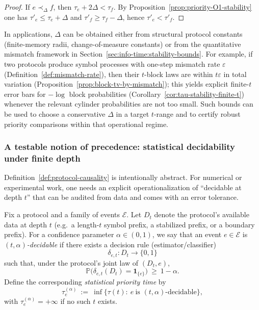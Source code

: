\begin{proof}
If $e\prec_\Delta f$, then $\tau_e+2\Delta<\tau_f$. By Proposition~\ref{prop:priority-O1-stability} one has $\tau'_e\le \tau_e+\Delta$ and $\tau'_f\ge \tau_f-\Delta$, hence $\tau'_e<\tau'_f$.
\end{proof}

\begin{remark}
In applications, $\Delta$ can be obtained either from structural protocol constants (finite-memory radii, change-of-measure constants) or from the quantitative mismatch framework in Section~\ref{sec:info-time:stability-bounds}.
For example, if two protocols produce symbol processes with one-step mismatch rate $\varepsilon$ (Definition~\ref{def:mismatch-rate}), then their $t$-block laws are within $t\varepsilon$ in total variation (Proposition~\ref{prop:block-tv-by-mismatch}); this yields explicit finite-$t$ error bars for $-\log$ block probabilities (Corollary~\ref{cor:tau-stability-finite-t}) whenever the relevant cylinder probabilities are not too small. Such bounds can be used to choose a conservative $\Delta$ in a target $t$-range and to certify robust priority comparisons within that operational regime.
\end{remark}

\subsubsection{A testable notion of precedence: statistical decidability under finite depth}\label{sec:causality:stat-testable}

Definition~\ref{def:protocol-causality} is intentionally abstract. For numerical or experimental work, one needs an explicit operationalization of ``decidable at depth $t$'' that can be audited from data and comes with an error tolerance.

\begin{definition}\label{def:stat-decidable}
Fix a protocol and a family of events $\mathcal{E}$. Let $D_t$ denote the protocol's available data at depth $t$ (e.g.\ a length-$t$ symbol prefix, a stabilized prefix, or a boundary prefix).
For a confidence parameter $\alpha\in(0,1)$, we say that an event $e\in\mathcal{E}$ is \emph{$(t,\alpha)$-decidable} if there exists a decision rule (estimator/classifier)
\[
\delta_{e,t}:D_t\to\{0,1\}
\]
such that, under the protocol's joint law of $(D_t,e)$,
\[
\mathbb{P}\bigl(\delta_{e,t}(D_t)=\mathbf{1}_{\{e\}}\bigr)\ \ge\ 1-\alpha.
\]
Define the corresponding \emph{statistical priority time} by
\[
\tau^{(\alpha)}_e\ :=\ \inf\{\tau(t):\ e\ \text{is $(t,\alpha)$-decidable}\},
\]
with $\tau^{(\alpha)}_e=+\infty$ if no such $t$ exists.
\end{definition}


